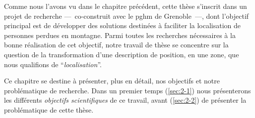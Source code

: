Comme nous l'avons vu dans le chapitre précédent, cette thèse
s'inscrit dans un projet de recherche ---~co-construit avec le
\ac{pghm} de Grenoble~---, dont l'objectif principal est de développer
des solutions destinées à faciliter la localisation de personnes
perdues en montagne. Parmi toutes les recherches nécessaires à la
bonne réalisation de cet objectif, notre travail de thèse se concentre
sur la question de la transformation d'une description de position, en
une zone, que nous qualifions de \enquote{\emph{localisation}}.

Ce chapitre se destine à présenter, plus en détail, nos objectifs et
notre problématique de recherche. Dans un premier temps
(\autoref{sec:2-1}) nous présenterons les différents \emph{objectifs
  scientifiques} de ce travail, avant (\autoref{sec:2-2}) de présenter
la problématique de cette thèse.

